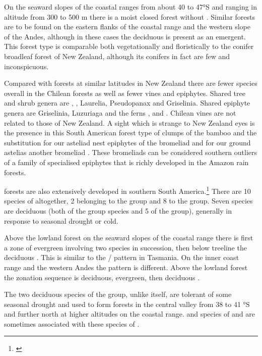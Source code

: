 On the seaward slopes of the coastal ranges from about 40 to 47°S and ranging in altitude from 300 to 500 m there is a moist closed forest without .
Similar forests are to be found on the eastern flanks of the coastal range and the western slope of the Andes, although in these cases the deciduous  is present as an emergent.
This forest type is comparable both vegetationally and floristically to the conifer broadleaf forest of New Zealand, although its conifers in fact are few and inconspicuous.

Compared with forests at similar latitudes in New Zealand there are fewer species overall in the Chilean forests as well as fewer vines and epiphytes.
Shared tree and shrub genera are , , Laurelia, Pseudopanax and Griselinia.
Shared epiphyte genera are Griselinia, Luzuriaga and the ferns ,  and .
Chilean vines are not related to those of New Zealand.
A sight which is strange to New Zealand eyes is the presence in this South American forest type of clumps of the bamboo  and the substitution for our asteliad nest epiphytes of the bromeliad  and for our ground astelias another bromeliad .
These bromeliads can be considered southern outliers of a family of specialised epiphytes that is richly developed in the Amazon rain forests.

 forests are also extensively developed in southern South America.\footnote{\cite{mcqueen1976ecology}}
There are 10 species of  altogether, 2 belonging to the  group and 8 to the  group.
Seven species are deciduous (both of the  group species and 5 of the  group), generally in response to seasonal drought or cold.

Above the lowland forest on the seaward slopes of the coastal range there is first a zone of evergreen  involving two species in succession, then below treeline the deciduous .
This is similar to the / pattern in Tasmania.
On the inner coast range and the western Andes the pattern is different.
Above the lowland forest the zonation sequence is deciduous, evergreen, then deciduous .

The two deciduous species of the  group, unlike  itself, are tolerant of some seasonal drought and used to form forests in the central valley from 38 to 41 °S and further north at higher altitudes on the coastal range.  and species of  and  are sometimes associated with these species of .

